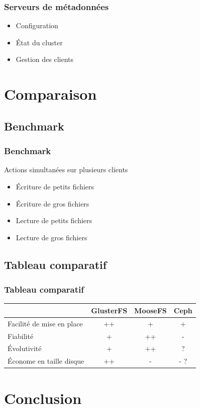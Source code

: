 \documentclass[blue]{beamer}
\begin{document}
        \begin{frame}
                \frametitle{Serveurs de métadonnées}
                \begin{itemize}
                        \item Configuration
                        \item État du cluster
                        \item Gestion des clients
                \end{itemize}
        \end{frame}

\section{Comparaison}
	\subsection{Benchmark}
		\begin{frame}
		\frametitle{Benchmark}
			Actions simultanées sur plusieurs clients
			\begin{itemize}
				\item Écriture de petits fichiers
				\item Écriture de gros fichiers
				\item Lecture de petits fichiers
				\item Lecture de gros fichiers
			\end{itemize}
		\end{frame}

	\subsection{Tableau comparatif}
		\begin{frame}
		\frametitle{Tableau comparatif}
			\begin{tabular}{|l|c|c|c|}
				\hline
				& \bf{GlusterFS} & \bf{MooseFS} & \bf{Ceph}\\
				\hline
				Facilité de mise en place & ++ & + & +\\
				\hline
				Fiabilité & + & ++ & -\\
				\hline
				Évolutivité & + & ++  & ?\\
				\hline
				Économe en taille disque & ++ & - & - ?\\
				\hline
			\end{tabular}
		\end{frame}

\section{Conclusion}
\begin{frame}

\end{frame}
\end{document}
